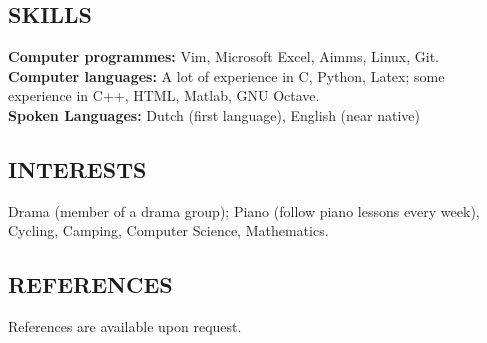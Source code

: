 \documentclass{article}
\begin{document}
\subsection{SKILLS}

\textbf{Computer programmes:} Vim, Microsoft Excel, Aimms, Linux, Git.
\\
\textbf{Computer languages:} A lot of experience in C, Python, Latex; some
experience in C++, HTML, Matlab, GNU Octave.
\\
\textbf{Spoken Languages:} Dutch (first language), English (near native)

\subsection{INTERESTS}

Drama (member of a drama group); Piano (follow piano lessons every
week), Cycling, Camping, Computer Science, Mathematics.

\subsection{REFERENCES}

References are available upon request.
\end{document}
